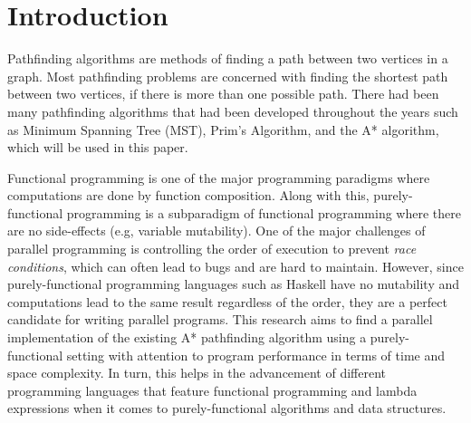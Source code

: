 \chapter{Introduction}

Pathfinding algorithms are methods of finding a path between two vertices in  
a graph. Most pathfinding problems are concerned with finding the shortest
path between two vertices, if there is more than one possible path. There had 
been many pathfinding algorithms that had been developed throughout the years 
such as Minimum Spanning Tree (MST), Prim's Algorithm\cite{Prim1957}, and the A*
algorithm, which will be used in this paper.\cite{HartNilssonRaphael1968}

Functional programming is one of the major programming paradigms where computations 
are done by function composition. Along with this, purely-functional programming is 
a subparadigm of functional programming where there are no side-effects (e.g, variable mutability).
One of the major challenges of parallel programming is controlling the order of execution
to prevent \emph{race conditions}, which can often lead to bugs and are hard to maintain.
However, since purely-functional programming languages such as Haskell\cite{HaskellSite}
have no mutability and computations lead to the same result regardless of the order, they 
are a perfect candidate for writing parallel programs.\cite{Hammond2011} 
This research aims to find a parallel implementation of the existing A* pathfinding algorithm
using a purely-functional setting with attention to program performance in terms of time and space 
complexity. \cite{ZaghloulAlJami2017, WeinstockHolladay}
In turn, this helps in the advancement of different programming languages that feature 
functional programming and lambda expressions when it comes to purely-functional algorithms and data structures.





